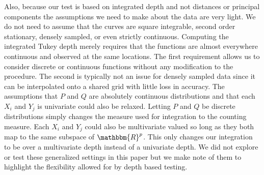 \documentclass[12pt]{article}
\begin{document}
Also, because our test is based on integrated depth and not distances or principal components the assumptions we need to make about the data are very light. We do not need to assume that the curves are square integrable, second order stationary, densely sampled, or even strictly continuous. Computing the integrated Tukey depth merely requires that the functions are almost everywhere continuous and observed at the same locations. The first requirement allows us to consider discrete or continuous functions without any modification to the procedure. The second is typically not an issue for densely sampled data since it can be interpolated onto a shared grid with little loss in accuracy. The assumptions that $P$ and $Q$ are absolutely continuous distributions and that each $X_i$ and $Y_j$ is univariate could also be relaxed. Letting $P$ and $Q$ be discrete distributions simply changes the measure used for integration to the counting measure. Each $X_i$ and $Y_j$ could also be multivariate valued so long as they both map to the same subspace of $\mathbbm{R}^p$. This only changes our integration to be over a multivariate depth instead of a univariate depth. We did not explore or test these generalized settings in this paper but we make note of them to highlight the flexibility allowed for by depth based testing.



\end{document}
